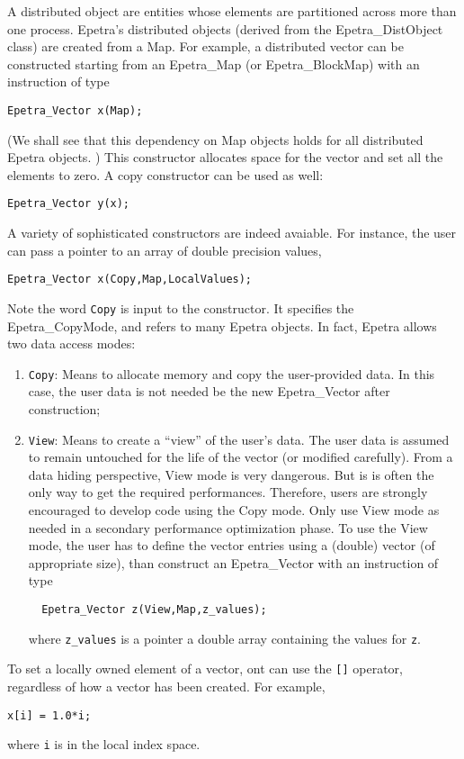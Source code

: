 A distributed object are entities whose elements are partitioned across
more than one process. Epetra's distributed objects (derived from the
Epetra\_DistObject class) are created from a Map. For example, a
distributed vector can be constructed starting from an Epetra\_Map (or
Epetra\_BlockMap) with an instruction of type
\begin{verbatim}
Epetra_Vector x(Map);
\end{verbatim}
(We shall see that this dependency on Map objects holds for all
distributed Epetra objects. ) This constructor allocates space for the
vector and set all the elements to zero. A copy constructor can be used
as well:
\begin{verbatim}
Epetra_Vector y(x);
\end{verbatim}
A variety of sophisticated constructors are indeed avaiable. For
instance, the user can pass a pointer to an array of double precision
values,
\begin{verbatim}
Epetra_Vector x(Copy,Map,LocalValues);
\end{verbatim}
Note the word \verb!Copy! is input to the constructor. It specifies the
Epetra\_CopyMode, and refers to many Epetra objects. In fact, Epetra
allows two data access modes:
\begin{enumerate}
\item \verb!Copy!: Means to allocate memory and copy the user-provided
  data. In this case, the user data is not needed be the new
  Epetra\_Vector after construction;
\item \verb!View!: Means to create a ``view'' of the user's data. The
  user data is assumed to remain untouched for the life of the vector
  (or modified carefully). From a data hiding perspective, View mode is
  very dangerous. But is is often the only way to get the required
  performances. Therefore, users are strongly encouraged to develop code
  using the Copy mode. Only use View mode as needed in a secondary
  performance optimization phase. To use the View mode, the user has to
  define the vector entries using a (double) vector (of appropriate
  size), than construct an Epetra\_Vector with an instruction of type
\begin{verbatim}
  Epetra_Vector z(View,Map,z_values);
\end{verbatim}
  where \verb!z_values! is a pointer a double array containing the
  values for \verb!z!.
\end{enumerate}

To set a locally owned element of a vector, ont can use the \verb![]!
operator, regardless of how a vector has been created. For example,
\begin{verbatim}
x[i] = 1.0*i;
\end{verbatim}
where \verb!i! is in the local index space. 

